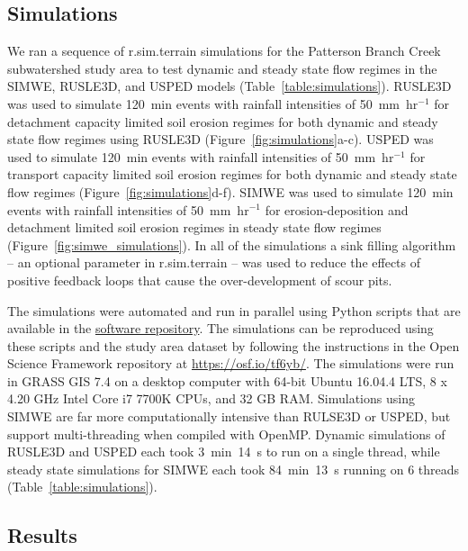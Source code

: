 \documentclass[gmd, manuscript]{copernicus}
\begin{document}
\subsection{Simulations}
%
We ran a sequence of r.sim.terrain simulations 
for the Patterson Branch Creek subwatershed study area
to test dynamic and steady state flow regimes
in the SIMWE, RUSLE3D, and USPED models
(Table~\ref{table:simulations}).
%
RUSLE3D was used to simulate 120~\unit{min} events
with rainfall intensities of 50~\unit{mm~hr}$^{-1}$
for detachment capacity limited soil erosion regimes
for both dynamic and steady state flow regimes
using RUSLE3D
(Figure~\ref{fig:simulations}a-c).
% 
USPED was used to simulate 120~\unit{min} events
with rainfall intensities of \unit{50~mm~hr}$^{-1}$
for transport capacity limited soil erosion regimes
for both dynamic and steady state flow regimes
(Figure~\ref{fig:simulations}d-f).
%
SIMWE was used to simulate 120~\unit{min} events 
with rainfall intensities of 50~\unit{mm~hr}$^{-1}$
for erosion-deposition 
and detachment limited soil erosion regimes 
in steady state flow regimes
(Figure~\ref{fig:simwe_simulations}).
%
In all of the simulations 
a sink filling algorithm
-- an optional parameter in r.sim.terrain -- 
was used to reduce the effects of positive feedback loops
that cause the over-development of scour pits. 

The simulations were automated and run in parallel
using Python scripts that are available in the 
\href{https://github.com/baharmon/landscape_evolution}{software repository}.
The simulations can be reproduced using these scripts
and the study area dataset 
by following the instructions 
in the Open Science Framework repository 
at \url{https://osf.io/tf6yb/}.
The simulations were run 
in GRASS GIS 7.4 
on a desktop computer 
with 64-bit Ubuntu 16.04.4 LTS,
8 x 4.20 GHz Intel Core i7 7700K CPUs,
and 32 GB RAM. 
Simulations using SIMWE 
are far more computationally intensive
than RULSE3D or USPED, 
but support multi-threading 
when compiled with OpenMP. 
Dynamic simulations of RUSLE3D and USPED each took
3~\unit{min}~14~\unit{s} to run on a single thread, 
while steady state simulations for SIMWE each took 
84~\unit{min}~13~\unit{s} running on 6 threads
(Table~\ref{table:simulations}).


\subsection{Results}
\end{document}
